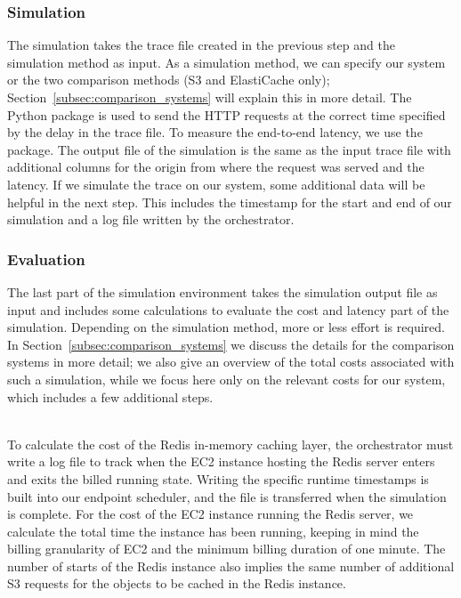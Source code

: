 \subsubsection{Simulation}
The simulation takes the trace file created in the previous step and the simulation method as input. As a simulation method, we can specify our system or the two comparison methods (S3 and ElastiCache only); Section~\ref{subsec:comparison_systems} will explain this in more detail. The Python package  is used to send the HTTP requests at the correct time specified by the delay in the trace file. To measure the end-to-end latency, we use the  package. The output file of the simulation is the same as the input trace file with additional columns for the origin from where the request was served and the latency. If we simulate the trace on our system, some additional data will be helpful in the next step. This includes the timestamp for the start and end of our simulation and a log file written by the orchestrator. 

\subsubsection{Evaluation}
The last part of the simulation environment takes the simulation output file as input and includes some calculations to evaluate the cost and latency part of the simulation. Depending on the simulation method, more or less effort is required. In Section~\ref{subsec:comparison_systems} we discuss the details for the comparison systems in more detail; we also give an overview of the total costs associated with such a simulation, while we focus here only on the relevant costs for our system, which includes a few additional steps. 

~\\
To calculate the cost of the Redis in-memory caching layer, the orchestrator must write a log file to track when the EC2 instance hosting the Redis server enters and exits the billed running state. Writing the specific runtime timestamps is built into our endpoint scheduler, and the file is transferred when the simulation is complete. For the cost of the EC2 instance running the Redis server, we calculate the total time the instance has been running, keeping in mind the billing granularity of EC2 and the minimum billing duration of one minute. The number of starts of the Redis instance also implies the same number of additional S3 requests for the objects to be cached in the Redis instance.

